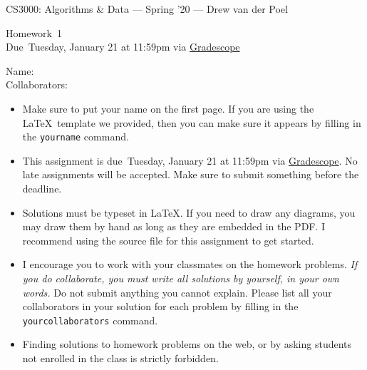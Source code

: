 \documentclass[11pt]{article}
\newcommand{\yourname}{}
\newcommand{\yourcollaborators}{}
\theoremstyle{definition}
\newcommand{\instructor}{Drew van der Poel}
\newcommand{\hwnum}{1}
\newcommand{\hwdue}{Tuesday, January 21 at 11:59pm via \href{https://gradescope.com/courses/74204}{Gradescope}}
\theoremstyle{theorem}
\begin{document}
{\Large 
\begin{center}{CS3000: Algorithms \& Data} --- Spring '20 --- \instructor \end{center}}
{\large
\vspace{10pt}
\noindent Homework~\hwnum \vspace{2pt}\\
Due~\hwdue}

\bigskip
{\large
\noindent Name: \yourname \vspace{2pt}\\ Collaborators: \yourcollaborators}

\vspace{15pt}
\begin{itemize}

\item Make sure to put your name on the first page.  If you are using the \LaTeX~template we provided, then you can make sure it appears by filling in the \texttt{yourname} command.

\item This assignment is due~\hwdue.  No late assignments will be accepted.  Make sure to submit something before the deadline.

\item Solutions must be typeset in \LaTeX.  If you need to draw any diagrams, you may draw them by hand as long as they are embedded in the PDF.  I recommend using the source file for this assignment to get started.

\item I encourage you to work with your classmates on the homework problems. \emph{If you do collaborate, you must write all solutions by yourself, in your own words.}  Do not submit anything you cannot explain.  Please list all your collaborators in your solution for each problem by filling in the \texttt{yourcollaborators} command.

\item Finding solutions to homework problems on the web, or by asking students not enrolled in the class is strictly forbidden.

\end{itemize}

\newpage
\end{document}
